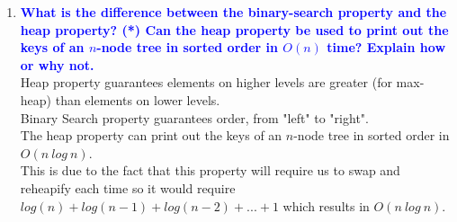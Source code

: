 \documentclass[11pt]{article}
\begin{document}
\begin{enumerate}
\item \textbf{\textcolor{blue}{What is the difference between 
the binary-search property and the heap property?
(*) Can the heap property be used to print out the keys of 
an $n$-node tree in sorted order in $O(n)$ time? Explain how or why not.}}
    \\ Heap property guarantees elements on higher levels are greater (for max-heap) than elements on lower levels.
    \\ Binary Search property guarantees order, from "left" to "right".
    \\ The heap property can print out the keys of an $n$-node tree in sorted order in $O(n\ log\ n)$.
    \\ This is due to the fact that this property will require us to swap and reheapify each time so 
    it would require $log(n) + log(n-1) + log(n-2) + ... + 1$ which results in $O(n\ log\ n)$.
    

\end{enumerate}
\end{document}
